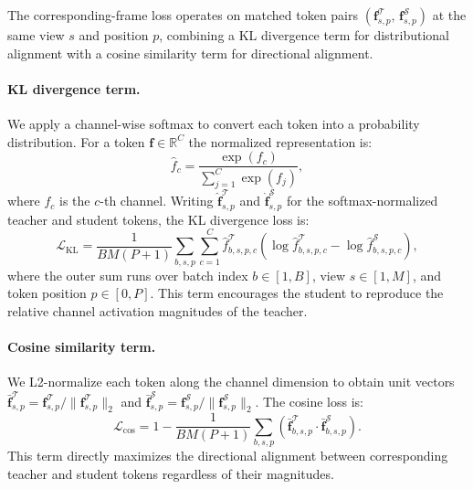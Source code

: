 The corresponding-frame loss operates on matched token pairs $(\mathbf{f}^{\mathcal{T}}_{s,p},\, \mathbf{f}^{\mathcal{S}}_{s,p})$ at the same view $s$ and position $p$, combining a KL divergence term for distributional alignment with a cosine similarity term for directional alignment.

\paragraph{KL divergence term.}
We apply a channel-wise softmax to convert each token into a probability distribution. For a token $\mathbf{f} \in \mathbb{R}^{C}$ the normalized representation is:
\begin{equation}
\hat{f}_c = \frac{\exp(f_c)}{\sum_{j=1}^{C} \exp(f_j)},
\label{eq:softmax}
\end{equation}
where $f_c$ is the $c$-th channel. Writing $\hat{\mathbf{f}}^{\mathcal{T}}_{s,p}$ and $\hat{\mathbf{f}}^{\mathcal{S}}_{s,p}$ for the softmax-normalized teacher and student tokens, the KL divergence loss is:
\begin{equation}
\mathcal{L}_{\text{KL}} = \frac{1}{BM(P+1)} \sum_{b,s,p} \sum_{c=1}^{C} \hat{f}^{\mathcal{T}}_{b,s,p,c} \left( \log \hat{f}^{\mathcal{T}}_{b,s,p,c} - \log \hat{f}^{\mathcal{S}}_{b,s,p,c} \right),
\label{eq:kl_loss}
\end{equation}
where the outer sum runs over batch index $b \in [1, B]$, view $s \in [1, M]$, and token position $p \in [0, P]$. This term encourages the student to reproduce the relative channel activation magnitudes of the teacher.

\paragraph{Cosine similarity term.}
We L2-normalize each token along the channel dimension to obtain unit vectors $\bar{\mathbf{f}}^{\mathcal{T}}_{s,p} = \mathbf{f}^{\mathcal{T}}_{s,p} / \|\mathbf{f}^{\mathcal{T}}_{s,p}\|_2$ and $\bar{\mathbf{f}}^{\mathcal{S}}_{s,p} = \mathbf{f}^{\mathcal{S}}_{s,p} / \|\mathbf{f}^{\mathcal{S}}_{s,p}\|_2$. The cosine loss is:
\begin{equation}
\mathcal{L}_{\text{cos}} = 1 - \frac{1}{BM(P+1)} \sum_{b,s,p} \left( \bar{\mathbf{f}}^{\mathcal{T}}_{b,s,p} \cdot \bar{\mathbf{f}}^{\mathcal{S}}_{b,s,p} \right).
\label{eq:cos_loss}
\end{equation}
This term directly maximizes the directional alignment between corresponding teacher and student tokens regardless of their magnitudes.

